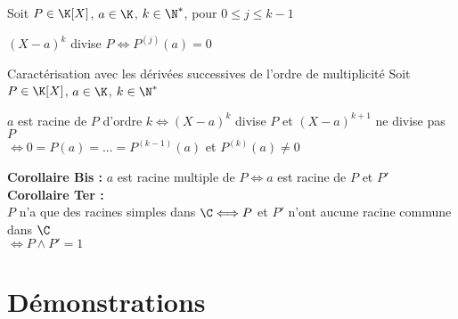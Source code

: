 \documentclass[12pt,a4paper]{report}
\begin{document}
\begin{theoreme}{}{}
Soit $P \in \K[X]$, $a\in \K$, $k\in \N^*$, pour $0\leq j \leq k-1$
\begin{center}
    $(X-a)^k$ divise $P \Longleftrightarrow P^{(j)} (a) = 0$
\end{center}
\end{theoreme}
\begin{demo}

\end{demo}



\begin{corollaire}{Caractérisation avec les dérivées successives de l'ordre de multiplicité}{}
Soit $P \in \K[X]$, $a\in \K$, $k\in \N^*$ 
\begin{center}
    $a$ est racine de $P$ d'ordre $k \Longleftrightarrow (X-a)^k$ divise $P$ et $(X-a)^{k+1}$ ne divise pas $P$ \\
    $\Longleftrightarrow 0 = P(a) = ... = P^{(k-1)} (a)$ et $P^{(k)} (a) \neq 0$ 
\end{center}

\textbf{Corollaire Bis :} $a$ est racine multiple de $P \Longleftrightarrow a$ est racine de $P$ et $P'$ \\
\textbf{Corollaire Ter :} \\
$P$ n'a que des racines simples dans $\C \Longleftrightarrow P$ et $P'$ n'ont aucune racine commune dans $\C$ \\$\Longleftrightarrow P\wedge P' =1$  
\end{corollaire}

\pagebreak


\section*{Démonstrations}
\end{document}
